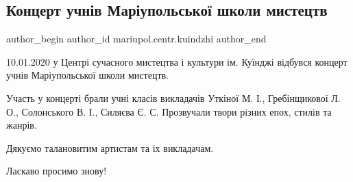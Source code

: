  
 
 
 
 

\subsection{Концерт учнів Маріупольської школи мистецтв}
\label{sec:14_01_2020.fb.mariupol.centr.kuindzhi.1.koncert_uchniv_mariupol_shkola_mystectv}

\ifcmt
 author_begin
   author_id mariupol.centr.kuindzhi
 author_end
\fi

10.01.2020 у Центрі сучасного мистецтва і культури ім. Куїнджі відбувся концерт
учнів Маріупольської школи мистецтв. 

Участь у концерті брали учні класів викладачів Уткіної М. І., Гребінщикової
Л. О., Солонського В. І., Силяєва Є. С. Прозвучали твори різних епох, стилів та
жанрів.

Дякуємо талановитим артистам та іх викладачам.

Ласкаво просимо знову!

